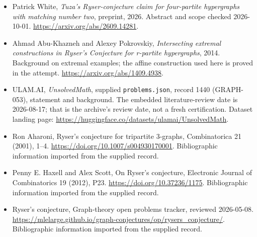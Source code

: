 \documentclass[11pt,a4paper]{article}
\begin{document}
{\small

\begin{itemize}
\item[Additional source A] Patrick White, \emph{Tuza's Ryser-conjecture claim for four-partite hypergraphs with matching number two}, preprint, 2026. Abstract and scope checked 2026-10-01. \url{https://arxiv.org/abs/2609.14281}.
\item[Additional source B] Ahmad Abu-Khazneh and Alexey Pokrovskiy, \emph{Intersecting extremal constructions in Ryser's Conjecture for r-partite hypergraphs}, 2014. Background on extremal examples; the affine construction used here is proved in the attempt. \url{https://arxiv.org/abs/1409.4938}.


\item[\hypertarget{source:1440:1}{S1}] ULAM.AI, \emph{UnsolvedMath}, supplied \texttt{problems.json}, record 1440 (GRAPH-053), statement and background. The embedded literature-review date is 2026-08-17; that is the archive’s review date, not a fresh certification. Dataset landing page: \url{https://huggingface.co/datasets/ulamai/UnsolvedMath}.

\item[\hypertarget{source:1440:2}{S2}] Ron Aharoni, Ryser's conjecture for tripartite 3-graphs, Combinatorica 21 (2001), 1–4. \url{https://doi.org/10.1007/s004930170001}. Bibliographic information imported from the supplied record.

\item[\hypertarget{source:1440:3}{S3}] Penny E. Haxell and Alex Scott, On Ryser's conjecture, Electronic Journal of Combinatorics 19 (2012), P23. \url{https://doi.org/10.37236/1175}. Bibliographic information imported from the supplied record.

\item[\hypertarget{source:1440:4}{S4}] Ryser's conjecture, Graph-theory open problems tracker, reviewed 2026-05-08. \url{https://mlelarge.github.io/graph-conjectures/op/rysers_conjecture/}. Bibliographic information imported from the supplied record.

\end{itemize}

}

\label{end:1440}
\end{document}
